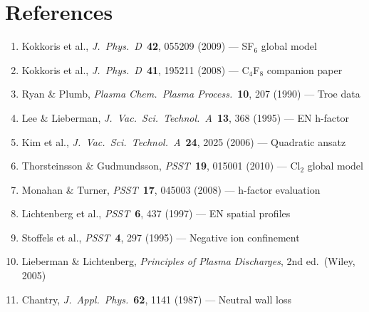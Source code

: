 \documentclass[11pt,a4paper]{article}
\begin{document}
\section{References}
\begin{enumerate}[nosep]
\item Kokkoris et al., \textit{J.\ Phys.\ D}\ \textbf{42}, 055209 (2009) --- SF$_6$ global model
\item Kokkoris et al., \textit{J.\ Phys.\ D}\ \textbf{41}, 195211 (2008) --- C$_4$F$_8$ companion paper
\item Ryan \& Plumb, \textit{Plasma Chem.\ Plasma Process.}\ \textbf{10}, 207 (1990) --- Troe data
\item Lee \& Lieberman, \textit{J.\ Vac.\ Sci.\ Technol.\ A}\ \textbf{13}, 368 (1995) --- EN h-factor
\item Kim et al., \textit{J.\ Vac.\ Sci.\ Technol.\ A}\ \textbf{24}, 2025 (2006) --- Quadratic ansatz
\item Thorsteinsson \& Gudmundsson, \textit{PSST}\ \textbf{19}, 015001 (2010) --- Cl$_2$ global model
\item Monahan \& Turner, \textit{PSST}\ \textbf{17}, 045003 (2008) --- h-factor evaluation
\item Lichtenberg et al., \textit{PSST}\ \textbf{6}, 437 (1997) --- EN spatial profiles
\item Stoffels et al., \textit{PSST}\ \textbf{4}, 297 (1995) --- Negative ion confinement
\item Lieberman \& Lichtenberg, \textit{Principles of Plasma Discharges}, 2nd ed.\ (Wiley, 2005)
\item Chantry, \textit{J.\ Appl.\ Phys.}\ \textbf{62}, 1141 (1987) --- Neutral wall loss
\end{enumerate}
\end{document}
